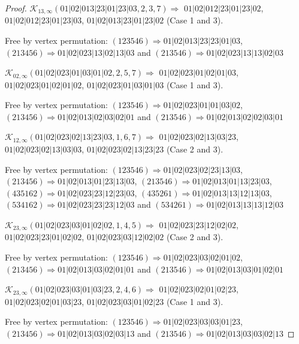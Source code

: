\documentclass[12pt]{article}
\theoremstyle{plain}
\theoremstyle{definition}
\theoremstyle{remark}
\newcommand{\fancy}[1]{\mathcal{#1}}
\def\K{\fancy{K}}
\begin{document}
\begin{proof}
	
	\bigskip
	
	$\K_{13,\infty}(01|02|013|23|01|23|03,2, 3, 7)\Rightarrow $ $01|02|012|23|01|23|02$, $01|02|012|23|01|23|03$, $01|02|013|23|01|23|02$ (Case 1 and 3).
	
	
	
	Free by vertex permutation: $(1 2 3 5 4 6)\Rightarrow 01|02|013|23|23|01|03$, $(2 1 3 4 5 6)\Rightarrow 01|02|023|13|02|13|03$ and $(2 1 3 5 4 6)\Rightarrow 01|02|023|13|13|02|03$
	
	
	\bigskip
	
	$\K_{02,\infty}(01|02|023|01|03|01|02,2, 5, 7)\Rightarrow $ $01|02|023|01|02|01|03$, $01|02|023|01|02|01|02$, $01|02|023|01|03|01|03$ (Case 1 and 3).
	
	
	
	Free by vertex permutation: $(1 2 3 5 4 6)\Rightarrow 01|02|023|01|01|03|02$, $(2 1 3 4 5 6)\Rightarrow 01|02|013|02|03|02|01$ and $(2 1 3 5 4 6)\Rightarrow 01|02|013|02|02|03|01$
	
	
	\bigskip
	
	$\K_{12,\infty}(01|02|023|02|13|23|03,1, 6, 7)\Rightarrow $ $01|02|023|02|13|03|23$, $01|02|023|02|13|03|03$, $01|02|023|02|13|23|23$ (Case 2 and 3).
	
	
	
	Free by vertex permutation: $(1 2 3 5 4 6)\Rightarrow 01|02|023|02|23|13|03$, $(2 1 3 4 5 6)\Rightarrow 01|02|013|01|23|13|03$, $(2 1 3 5 4 6)\Rightarrow 01|02|013|01|13|23|03$, $(4 3 5 1 6 2)\Rightarrow 01|02|023|23|12|23|03$, $(4 3 5 2 6 1)\Rightarrow 01|02|013|13|12|13|03$, $(5 3 4 1 6 2)\Rightarrow 01|02|023|23|23|12|03$ and $(5 3 4 2 6 1)\Rightarrow 01|02|013|13|13|12|03$
	
	
	\bigskip
	
	$\K_{23,\infty}(01|02|023|03|01|02|02,1, 4, 5)\Rightarrow $ $01|02|023|23|12|02|02$, $01|02|023|23|01|02|02$, $01|02|023|03|12|02|02$ (Case 2 and 3).
	
	
	
	Free by vertex permutation: $(1 2 3 5 4 6)\Rightarrow 01|02|023|03|02|01|02$, $(2 1 3 4 5 6)\Rightarrow 01|02|013|03|02|01|01$ and $(2 1 3 5 4 6)\Rightarrow 01|02|013|03|01|02|01$
	
	
	\bigskip
	
	$\K_{23,\infty}(01|02|023|03|01|03|23,2, 4, 6)\Rightarrow $ $01|02|023|02|01|02|23$, $01|02|023|02|01|03|23$, $01|02|023|03|01|02|23$ (Case 1 and 3).
	
	
	
	Free by vertex permutation: $(1 2 3 5 4 6)\Rightarrow 01|02|023|03|03|01|23$, $(2 1 3 4 5 6)\Rightarrow 01|02|013|03|02|03|13$ and $(2 1 3 5 4 6)\Rightarrow 01|02|013|03|03|02|13$
	

\end{proof}
\end{document}
